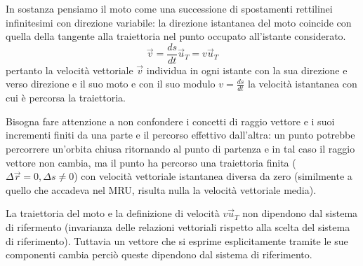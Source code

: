 \documentclass[class=book, crop=false, oneside, 12pt]{standalone}
\begin{document}
In sostanza pensiamo il moto come una successione di spostamenti rettilinei infinitesimi con direzione variabile: la direzione istantanea del moto coincide con quella della tangente alla traiettoria nel punto occupato all'istante considerato.
\begin{equation}
  \overrightarrow{v} = \frac{ds}{dt} \overrightarrow{u}_T = v \overrightarrow{u}_T
\end{equation}
pertanto la velocità vettoriale \(\overrightarrow{v}\) individua in ogni istante con la sua direzione e verso direzione e il suo moto e con il suo modulo \(v = \frac{ds}{dt}\) la velocità istantanea con cui è percorsa la traiettoria. 

Bisogna fare attenzione a non confondere i concetti di raggio vettore e i suoi incrementi finiti da una parte e il percorso effettivo dall'altra:
un punto potrebbe percorrere un'orbita chiusa ritornando al punto di partenza e in tal caso il raggio vettore non cambia, ma il punto ha percorso una traiettoria finita (\(\Delta \overrightarrow{r} = 0, \Delta s \neq 0\)) con velocità vettoriale istantanea diversa da zero (similmente a quello che accadeva nel MRU, risulta nulla la velocità vettoriale media).

La traiettoria del moto e la definizione di velocità \(v \overrightarrow{u}_T\) non dipendono dal sistema di rifermento (invarianza delle relazioni vettoriali rispetto alla scelta del sistema di riferimento).
Tuttavia un vettore che si esprime esplicitamente tramite le sue componenti cambia perciò queste dipendono dal sistema di riferimento.
\end{document}
